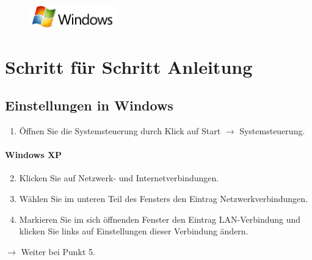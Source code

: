 \documentclass[a4paper,12pt]{scrartcl}
\begin{document}
\newpage
\enlargethispage{20pt}

\begin{figure}[t!]
    \raggedleft
    \vspace{-20pt}
    \includegraphics[height=1cm,keepaspectratio]{Bilder/Windows_logo}
    \vspace{-20pt}
\end{figure}

\section*{Schritt für Schritt Anleitung}
\subsection*{Einstellungen in Windows}
\begin{enumerate}
    \item Öffnen Sie die Systemsteuerung durch Klick auf Start $\rightarrow$ Systemsteuerung.
\end{enumerate}
\vspace{-15pt}
\paragraph*{Windows XP}
\begin{enumerate}
     \setcounter{enumi}{1}
     \item Klicken Sie auf Netzwerk- und Internetverbindungen.
     \item Wählen Sie im unteren Teil des Fensters den Eintrag Netzwerkverbindungen. 
     \item Markieren Sie im sich öffnenden Fenster den Eintrag LAN-Verbindung und klicken Sie links auf Einstellungen dieser Verbindung ändern.
\end{enumerate}
$\rightarrow$ Weiter bei Punkt 5.
\vspace{-10pt}
\end{document}
